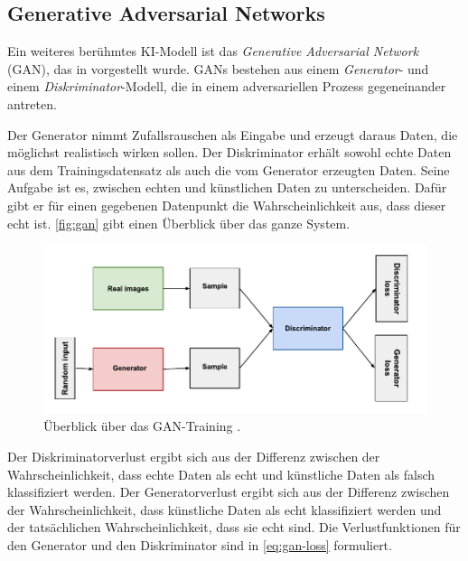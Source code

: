
\subsection{Generative Adversarial Networks} \label{subsec:gan}

Ein weiteres berühmtes KI-Modell ist das \emph{Generative Adversarial Network} (GAN), das in \parencite{Goodfellow2014gan} vorgestellt wurde. GANs bestehen aus einem \emph{Generator}- und einem \emph{Diskriminator}-Modell, die in einem adversariellen Prozess gegeneinander antreten.

Der Generator nimmt Zufallsrauschen als Eingabe und erzeugt daraus Daten, die möglichst realistisch wirken sollen. Der Diskriminator erhält sowohl echte Daten aus dem Trainingsdatensatz als auch die vom Generator erzeugten Daten. Seine Aufgabe ist es, zwischen echten und künstlichen Daten zu unterscheiden. Dafür gibt er für einen gegebenen Datenpunkt die Wahrscheinlichkeit aus, dass dieser echt ist. \autoref{fig:gan} gibt einen Überblick über das ganze System.

\begin{figure}[h]
	\centering
	\includegraphics[width=\textwidth]{figure_gan.pdf}
	\caption[Überblick über das GAN-Training.]{Überblick über das GAN-Training \parencite{GoogleDev2022ganfigure}.}
	\label{fig:gan}
\end{figure}

Der Diskriminatorverlust ergibt sich aus der Differenz zwischen der Wahrscheinlichkeit, dass echte Daten als echt und künstliche Daten als falsch klassifiziert werden. Der Generatorverlust ergibt sich aus der Differenz zwischen der Wahrscheinlichkeit, dass künstliche Daten als echt klassifiziert werden und der tatsächlichen Wahrscheinlichkeit, dass sie echt sind. Die Verlustfunktionen für den Generator und den Diskriminator sind in \autoref{eq:gan-loss} formuliert.

